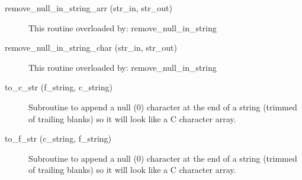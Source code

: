 \begin{description}
\label{r:remove.null.in.string.arr}
\item[remove_null_in_string_arr (str_in, str_out)] \Newline 
This routine overloaded by:
       remove_null_in_string

\label{r:remove.null.in.string.char}
\item[remove_null_in_string_char (str_in, str_out)] \Newline 
This routine overloaded by:
       remove_null_in_string

\label{r:to.c.str}
\item[to_c_str (f_string, c_string)] \Newline 
Subroutine to append a null (0) character at the end of a string (trimmed
of trailing blanks) so it will look like a C character array. 

\label{r:to.f.str}
\item[to_f_str (c_string, f_string)] \Newline 
Subroutine to append a null (0) character at the end of a string (trimmed
of trailing blanks) so it will look like a C character array. 

\end{description}

%
%
